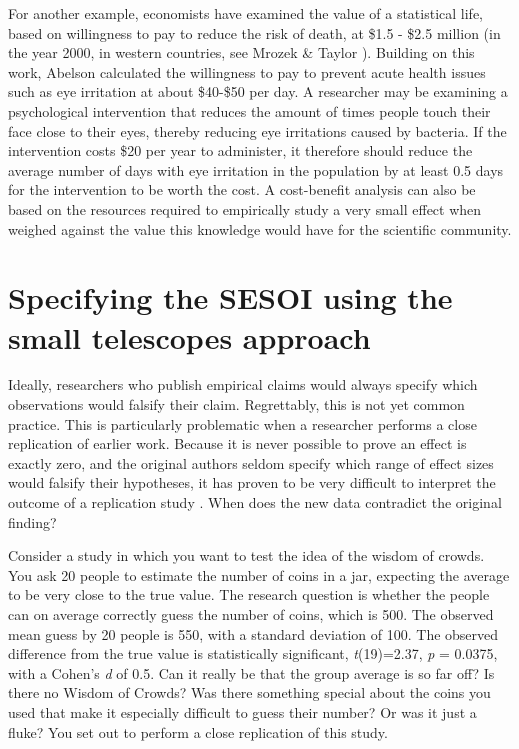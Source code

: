 \documentclass[
  oneside]{krantz}
\begin{document}
For another example, economists have examined the value of a statistical life, based on willingness to pay to reduce the risk of death, at \$1.5 - \$2.5 million (in the year 2000, in western countries, see Mrozek \& Taylor \citeyearpar{mrozek_what_2002}). Building on this work, Abelson \citeyearpar{abelson_value_2003} calculated the willingness to pay to prevent acute health issues such as eye irritation at about \$40-\$50 per day. A researcher may be examining a psychological intervention that reduces the amount of times people touch their face close to their eyes, thereby reducing eye irritations caused by bacteria. If the intervention costs \$20 per year to administer, it therefore should reduce the average number of days with eye irritation in the population by at least 0.5 days for the intervention to be worth the cost. A cost-benefit analysis can also be based on the resources required to empirically study a very small effect when weighed against the value this knowledge would have for the scientific community.

\hypertarget{specifying-the-sesoi-using-the-small-telescopes-approach}{%
\section{Specifying the SESOI using the small telescopes approach}\label{specifying-the-sesoi-using-the-small-telescopes-approach}}

Ideally, researchers who publish empirical claims would always specify which observations would falsify their claim. Regrettably, this is not yet common practice. This is particularly problematic when a researcher performs a close replication of earlier work. Because it is never possible to prove an effect is exactly zero, and the original authors seldom specify which range of effect sizes would falsify their hypotheses, it has proven to be very difficult to interpret the outcome of a replication study \citep{anderson_theres_2016}. When does the new data contradict the original finding?

Consider a study in which you want to test the idea of the wisdom of crowds. You ask 20 people to estimate the number of coins in a jar, expecting the average to be very close to the true value. The research question is whether the people can on average correctly guess the number of coins, which is 500. The observed mean guess by 20 people is 550, with a standard deviation of 100. The observed difference from the true value is statistically significant, \emph{t}(19)=2.37, \emph{p} = 0.0375, with a Cohen's \emph{d} of 0.5. Can it really be that the group average is so far off? Is there no Wisdom of Crowds? Was there something special about the coins you used that make it especially difficult to guess their number? Or was it just a fluke? You set out to perform a close replication of this study.
\end{document}
